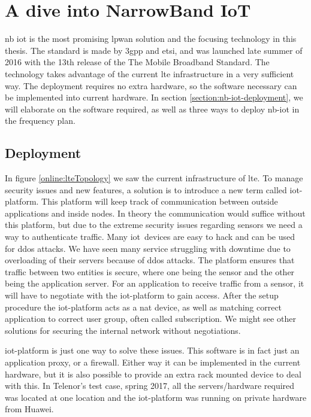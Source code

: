 \documentclass[USenglish]{ifimaster}  %
\begin{document}
\chapter{A dive into NarrowBand IoT} \label{section:nb-iot}
\acrfull{nb} \acrfull{iot} is the most promising \acrshort{lpwan} solution and the focusing technology in this thesis. The standard is made by \acrfull{3gpp} and \acrfull{etsi}, and was launched late summer of 2016 with the 13th release of the The Mobile Broadband Standard. The technology takes advantage of the current \acrshort{lte} infrastructure in a very sufficient way. The deployment requires no extra hardware, so the software necessary can be implemented into current hardware. In section \vref{section:nb-iot-deployment}, we will elaborate on the software required, as well as three ways to deploy \acrshort{nb-iot} in the frequency plan.

\section{Deployment} \label{section:nb-iot-deployment} %
In figure \vref{online:lteTopology} we saw the current infrastructure of \acrshort{lte}. To manage security issues and new features, a solution is to introduce a new term called \acrfull{iot-platform}. This platform will keep track of communication between outside applications and inside nodes. In theory the communication would suffice without this platform, but due to the extreme security issues regarding sensors we need a way to authenticate traffic. Many \acrshort{iot} devices are easy to hack and can be used for \acrfull{ddos} attacks. We have seen many service struggling with downtime due to overloading of their servers because of \acrshort{ddos} attacks. The platform ensures that traffic between two entities is secure, where one being the sensor and the other being the application server. For an application to receive traffic from a sensor, it will have to negotiate with the \acrshort{iot-platform} to gain access. After the setup procedure the \acrshort{iot-platform} acts as a \acrshort{nat} device, as well as matching correct application to correct user group, often called subscription. We might see other solutions for securing the internal network without negotiations.


\acrshort{iot-platform} is just one way to solve these issues. This software is in fact just an application proxy, or a firewall. Either way it can be implemented in the current hardware, but it is also possible to provide an extra rack mounted device to deal with this. In Telenor's test case, spring 2017, all the servers/hardware required was located at one location and the \acrshort{iot-platform} was running on private hardware from Huawei.
\end{document}
